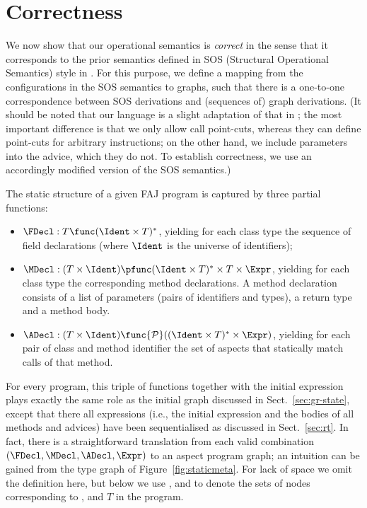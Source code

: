\section{Correctness}
\label{sec:correctness}

We now show that our operational semantics is \emph{correct} in the sense that
it corresponds to the prior semantics defined in SOS (Structural Operational
Semantics) style in \cite{DDFL-NoE06}. For this purpose, we define a mapping
from the configurations in the SOS semantics to graphs, such that there is a
one-to-one correspondence between SOS derivations and (sequences of) graph
derivations. (It should be noted that our language is a slight adaptation of
that in \cite{DDFL-NoE06}; the most important difference is that we only allow
call point-cuts, whereas they can define point-cuts for arbitrary instructions;
on the other hand, we include parameters into the advice, which they do not. To
establish correctness, we use an accordingly modified version of the SOS
semantics.)

The static structure of a given FAJ program is captured by three partial functions:
\begin{itemize}
\item $\FDecl: T \func (\Ident\times T)^*$, yielding for each class type the
  sequence of field declarations (where $\Ident$ is the universe of identifiers);
\item $\MDecl: (T\times \Ident) \pfunc (\Ident \times T)^* \times T\times
  \Expr$, yielding for each class type the corresponding method declarations.
  A method declaration consists of a list of parameters (pairs of identifiers
  and types), a return type and a method body.
\item $\ADecl: (T \times \Ident) \func {\cal P}((\Ident \times T)^* \times
  \Expr)$, yielding for each pair of class and method identifier the set of
  aspects that statically match calls of that method.
\end{itemize}
%
For every program, this triple of functions together with the initial
expression plays exactly the same role as the initial graph discussed in
Sect.~\ref{sec:gr-state}, except that there all expressions (i.e., the initial
expression and the bodies of all methods and advices) have been sequentialised
as discussed in Sect.~\ref{sec:rt}. In fact, there is a straightforward
translation from each valid combination $(\FDecl,\MDecl,\ADecl,\Expr)$ to an
aspect program graph; an intuition can be gained from the type graph of
Figure~\ref{fig:staticmeta}. For lack of space we omit the definition here, but
below we use \InstrL{}, \IdentL{} and \ClassL{} to denote the sets of nodes
corresponding to \Instr{}, \Ident{} and $T$ in the program.

